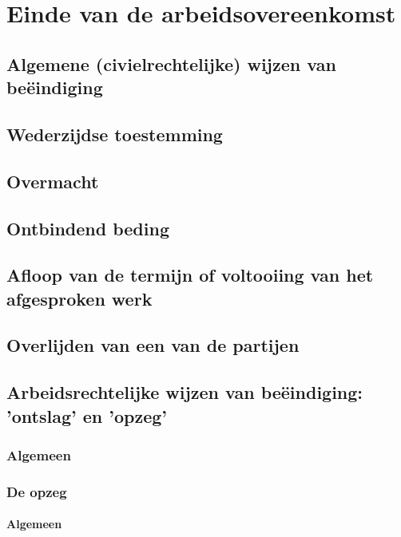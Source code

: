 \chapter{Einde van de arbeidsovereenkomst}
\label{hoofdstuk:2}

\section{Algemene (civielrechtelijke) wijzen van beëindiging}

\section{Wederzijdse toestemming}

\section{Overmacht}

\section{Ontbindend beding}

\section{Afloop van de termijn of voltooiing van het afgesproken werk}

\section{Overlijden van een van de partijen}

\section{Arbeidsrechtelijke wijzen van beëindiging: 'ontslag' en 'opzeg'}

\subsection{Algemeen}

\subsection{De opzeg}

\subsubsection{Algemeen}

